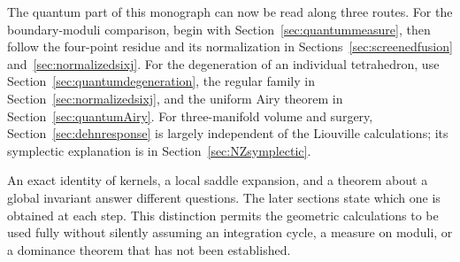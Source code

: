 The quantum part of this monograph can now be read along three routes.
For the boundary-moduli comparison, begin with
Section~\ref{sec:quantummeasure}, then follow the four-point residue
and its normalization in Sections~\ref{sec:screenedfusion}
and~\ref{sec:normalizedsixj}. For the degeneration of an individual
tetrahedron, use Section~\ref{sec:quantumdegeneration}, the regular
family in Section~\ref{sec:normalizedsixj}, and the uniform Airy
theorem in Section~\ref{sec:quantumAiry}. For three-manifold volume
and surgery, Section~\ref{sec:dehnresponse} is largely independent
of the Liouville calculations; its symplectic explanation is in
Section~\ref{sec:NZsymplectic}.

An exact identity of kernels, a local saddle expansion, and a
theorem about a global invariant answer different questions. The
later sections state which one is obtained at each step. This
distinction permits the geometric calculations to be used fully
without silently assuming an integration cycle, a measure on
moduli, or a dominance theorem that has not been established.


